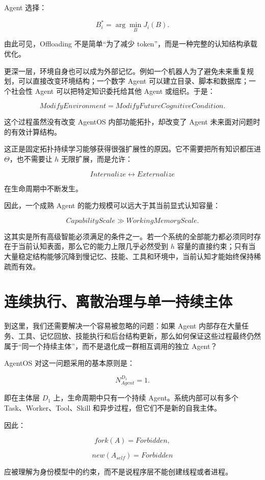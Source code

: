 Agent 选择：

\[
B_i^*
=
\arg\min_B J_i(B).
\]

由此可见，Offloading 不是简单“为了减少 token”，而是一种完整的认知结构承载优化。

更深一层，环境自身也可以成为外部记忆。例如一个机器人为了避免未来重复规划，可以直接改变环境结构；一个数字 Agent 可以建立目录、脚本和数据库；一个社会性 Agent 可以把特定知识委托给其他 Agent 或组织。于是：

\[
\boxed{
ModifyEnvironment
=
ModifyFutureCognitiveCondition.
}
\]

这个过程虽然没有改变 AgentOS 内部功能拓扑，却改变了 Agent 未来面对问题时的有效计算结构。

这正是固定拓扑持续学习能够获得很强扩展性的原因。它不需要把所有知识都压进 $\Theta$，也不需要让 $h$ 无限扩展，而是允许：

\[
Internalize
\leftrightarrow
Externalize
\]

在生命周期中不断发生。

因此，一个成熟 Agent 的能力规模可以远大于其当前显式认知容量：

\[
\boxed{
CapabilityScale
\gg
WorkingMemoryScale.
}
\]

这其实是所有高级智能必须满足的条件之一。若一个系统的全部能力都必须同时存在于当前认知表面，那么它的能力上限几乎必然受到 $h$ 容量的直接约束；只有当大量稳定结构能够沉降到慢记忆、技能、工具和环境中，当前认知才能始终保持稀疏而有效。

\section{连续执行、离散治理与单一持续主体}

到这里，我们还需要解决一个容易被忽略的问题：如果 Agent 内部存在大量任务、工具、记忆回放、技能执行和后台结构更新，那么如何保证这些过程最终仍然属于“同一个持续主体”，而不是退化成一群相互调用的独立 Agent？

AgentOS 对这一问题采用的基本原则是：

\[
\boxed{
N^{D_1}_{Agent}=1.
}
\]

即在主体层 $D_1$ 上，生命周期中只有一个持续 Agent。系统内部可以有多个 Task、Worker、Tool、Skill 和异步过程，但它们不是新的自我主体。

因此：

\[
fork(A)
=
Forbidden,
\]

\[
new(A_{self})
=
Forbidden
\]

应被理解为身份模型中的约束，而不是说程序层不能创建线程或者进程。

